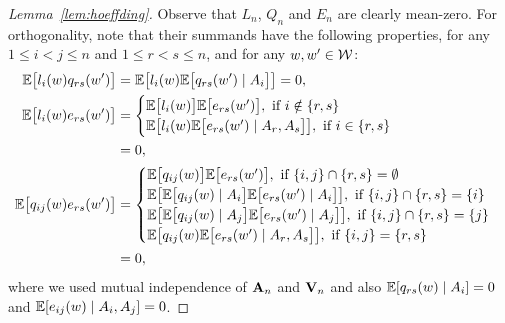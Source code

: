 \begin{proof}[Lemma~\ref{lem:hoeffding}]
  Observe that
  $L_n$, $Q_n$ and $E_n$
  are clearly mean-zero.
  For orthogonality,
  note that their summands
  have the following properties,
  for any $1 \leq i < j \leq n$
  and $1 \leq r < s \leq n$,
  and for any $w, w' \in \mathcal{W}$:
  \begin{align*}
    \mathbb{E}\big[
      l_i(w)
      q_{rs}(w')
      \big]
    &=
    \mathbb{E}\big[
      l_i(w)
      \mathbb{E}\big[
        q_{rs}(w') \mid A_i
        \big]
      \big]
    = 0, \\
    \mathbb{E}\big[
      l_i(w)
      e_{rs}(w')
      \big]
    &=
    \begin{cases}
      \mathbb{E}\big[
        l_i(w)
        \big]
      \mathbb{E}\big[
        e_{rs}(w')
        \big],
      \text{ if } i \notin \{r,s\} \\
      \mathbb{E}\big[
        l_i(w)
        \mathbb{E}\big[
          e_{rs}(w') \mid A_r, A_s
          \big]
        \big],
      \text{ if } i \in \{r,s\}
    \end{cases} \\
    &=
    0, \\
    \mathbb{E}\big[
      q_{ij}(w)
      e_{rs}(w')
      \big]
    &=
    \begin{cases}
      \mathbb{E}\big[
        q_{ij}(w)
        \big]
      \mathbb{E}\big[
        e_{rs}(w')
        \big],
      \text{ if } \{i,j\} \cap \{r,s\} = \emptyset \\
      \mathbb{E}\big[
        \mathbb{E}\big[
          q_{ij}(w) \mid A_i
          \big]
        \mathbb{E}\big[
          e_{rs}(w') \mid A_i
          \big]
        \big],
      \text{ if } \{i,j\} \cap \{r,s\} = \{i\}     \\
      \mathbb{E}\big[
        \mathbb{E}\big[
          q_{ij}(w) \mid A_j
          \big]
        \mathbb{E}\big[
          e_{rs}(w') \mid A_j
          \big]
        \big],
      \text{ if } \{i,j\} \cap \{r,s\} = \{j\}     \\
      \mathbb{E}\big[
        q_{ij}(w)
        \mathbb{E}\big[
          e_{rs}(w') \mid A_r, A_s
          \big]
        \big],
      \text{ if } \{i,j\} = \{r,s\}
    \end{cases} \\
    &=
    0,
  \end{align*}
  where we used mutual independence of
  $\mathbf{A}_n$ and $\mathbf{V}_n$
  and also
  $\mathbb{E}[q_{rs}(w) \mid A_i] = 0$
  and
  $\mathbb{E}[e_{ij}(w) \mid A_i, A_j] = 0$.
\end{proof}

